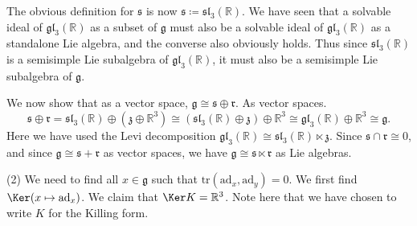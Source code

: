 \documentclass[11pt, letterpaper]{article}
\theoremstyle{plain}
\begin{document}
The obvious definition for $\mathfrak{s} $ is now $\mathfrak{s} \coloneqq \mathfrak{sl} _3(\mathbb{R} )$. We have seen that a solvable ideal of $\mathfrak{gl} _3(\mathbb{R} )$ as a subset of $\mathfrak{g} $ must also be a solvable ideal of $\mathfrak{gl} _3(\mathbb{R} )$ as a standalone Lie algebra, and the converse also obviously holds. Thus since $\mathfrak{sl} _3(\mathbb{R} )$ is a semisimple Lie subalgebra of $\mathfrak{gl} _3(\mathbb{R} )$, it must also be a semisimple Lie subalgebra of $\mathfrak{g} $.

We now show that as a vector space, $\mathfrak{g} \cong \mathfrak{s} \oplus \mathfrak{r} $. As vector spaces.
\[
	\mathfrak{s} \oplus \mathfrak{r}  = \mathfrak{sl} _3(\mathbb{R} ) \oplus (\mathfrak{z} \oplus \mathbb{R} ^3) \cong (\mathfrak{sl} _3(\mathbb{R} )\oplus \mathfrak{z} )\oplus \mathbb{R} ^3 \cong \mathfrak{gl}_3(\mathbb{R} ) \oplus \mathbb{R} ^3 \cong \mathfrak{g} 
.\]
Here we have used the Levi decomposition $\mathfrak{gl} _3(\mathbb{R} ) \cong \mathfrak{sl} _3(\mathbb{R} )\ltimes \mathfrak{z} $. Since $\mathfrak{s} \cap \mathfrak{r} \cong 0$, and since $\mathfrak{g} \cong \mathfrak{s} +\mathfrak{r} $ as vector spaces, we have $\mathfrak{g} \cong \mathfrak{s} \ltimes \mathfrak{r} $ as Lie algebras.

(2) We need to find all $x\in \mathfrak{g} $ such that $\mathrm{tr} (\mathrm{ad} _x,\mathrm{ad} _y)=0$. We first find $\Ker (x\mapsto \mathrm{ad} _x)$. We claim that $\Ker K =\mathbb{R} ^3$. Note here that we have chosen to write $K$ for the Killing form.
\end{document}
